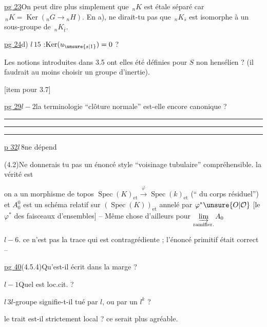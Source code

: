
\quad \uline{pg 23}\qquad On peut dire plus simplement que $\,{}_nK$ est étale séparé car $\,{}_nK=\operatorname{Ker}({}_nG\longrightarrow{}_nH)$. En a), ne dirait-tu pas que $\,{}_nK_{\bar s}$ est isomorphe à un sous-groupe de $\,{}_nK_{\bar t}$.

\uline{pg 24}\quad d) $l\,15$ :\quad {}$\operatorname{Ker}(u_{\unsure{s|1}})=0$ ?

\quad Les notions introduites dans 3.5 ont elles été définies pour $S$ non hensélien ? (il faudrait au moins choisir un groupe d'inertie).

[item pour 3.7]

\uline{pg 29}\quad $l-2$\quad la terminologie ``clôture normale'' est-elle encore canonique ?

\hrule\smallskip\hrule\smallskip\hrule

\quad \uline{p 32}\quad $l\,8$\qquad ne dépend 

\quad (4.2)\qquad Ne donnerais tu pas un énoncé style ``voisinage tubulaire'' compréhensible. la vérité est

 on a un morphisme de topos $\operatorname{Spec}(K)_{\mathrm{et}}\xrightarrow{\varphi}\operatorname{Spec}(k)_{\mathrm{et}}$ (`` du corps résiduel'') et $A_0^0$ est un schéma relatif sur $(\operatorname{Spec}(K))_{\mathrm{et}}$ annelé par $\varphi^*\unsure{O|\mathcal O}$ [le $\varphi^*$ des faisceaux d'ensembles] -- Même chose d'ailleurs pour $\underset{\text{ramifier.}}{\varinjlim}\, A_0$

\quad $l-6$.\qquad {} ce n'est pas la trace qui est contragrédiente ; l'énoncé primitif était correct --

\uline{pg 40}\qquad (4.5.4)\quad Qu'est-il écrit dans la marge ?

$l-1$\qquad Quel est loc.cit. ?

$l\,3$\qquad $l$-groupe signifie-t-il tué par $l$, ou par un $l^k$ ?

le trait est-il strictement local ? ce serait plus agréable.
